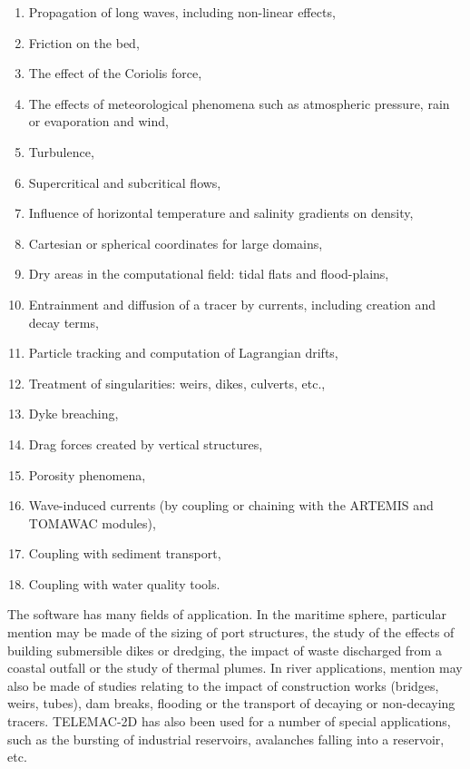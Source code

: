 \documentclass{article} %
\begin{document}
\begin{enumerate}
\item  Propagation of long waves, including non-linear effects,

\item  Friction on the bed,

\item  The effect of the Coriolis force,

\item  The effects of meteorological phenomena such as atmospheric pressure, rain or evaporation and wind,

\item  Turbulence,

\item  Supercritical and subcritical flows,

\item  Influence of horizontal temperature and salinity gradients on density,

\item  Cartesian or spherical coordinates for large domains,

\item  Dry areas in the computational field: tidal flats and flood-plains,

\item  Entrainment and diffusion of a tracer by currents, including creation and decay terms,

\item  Particle tracking and computation of Lagrangian drifts,

\item  Treatment of singularities: weirs, dikes, culverts, etc.,

\item  Dyke breaching,

\item  Drag forces created by vertical structures,

\item  Porosity phenomena,

\item  Wave-induced currents (by coupling or chaining with the ARTEMIS and TOMAWAC modules),

\item  Coupling with sediment transport,

\item  Coupling with water quality tools.
\end{enumerate}

 The software has many fields of application. In the maritime sphere, particular mention may be made of the sizing of port structures, the study of the effects of building submersible dikes or dredging, the impact of waste discharged from a coastal outfall or the study of thermal plumes. In river applications, mention may also be made of studies relating to the impact of construction works (bridges, weirs, tubes), dam breaks, flooding or the transport of decaying or non-decaying tracers. TELEMAC-2D has also been used for a number of special applications, such as the bursting of industrial reservoirs, avalanches falling into a reservoir, etc.
\end{document}
